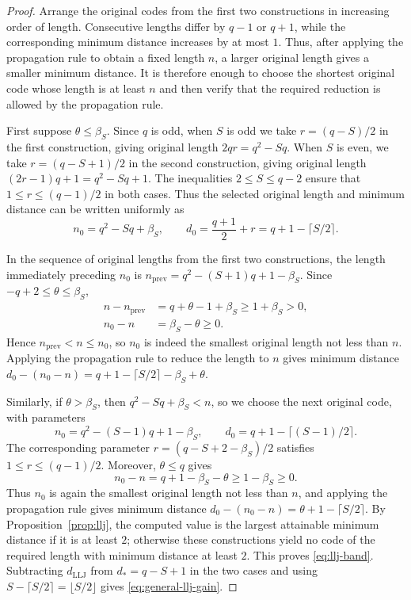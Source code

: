 \documentclass[preprint,12pt,a4paper]{elsarticle}
\begin{document}
\begin{proof}
Arrange the original codes from the first two constructions in increasing order of length. Consecutive lengths differ by $q-1$ or $q+1$, while the corresponding minimum distance increases by at most $1$. Thus, after applying the propagation rule to obtain a fixed length $n$, a larger original length gives a smaller minimum distance. It is therefore enough to choose the shortest original code whose length is at least $n$ and then verify that the required reduction is allowed by the propagation rule.

First suppose $\theta\le\beta_S$. Since $q$ is odd, when $S$ is odd we take $r=(q-S)/2$ in the first construction, giving original length $2qr=q^2-Sq$. When $S$ is even, we take $r=(q-S+1)/2$ in the second construction, giving original length $(2r-1)q+1=q^2-Sq+1$. The inequalities $2\le S\le q-2$ ensure that $1\le r\le(q-1)/2$ in both cases. Thus the selected original length and minimum distance can be written uniformly as
\[
 n_0=q^2-Sq+\beta_S,\qquad
 d_0=\frac{q+1}{2}+r=q+1-\lceil S/2\rceil.
\]

In the sequence of original lengths from the first two constructions, the length immediately preceding $n_0$ is $n_{\mathrm{prev}}=q^2-(S+1)q+1-\beta_S$. Since $-q+2\le\theta\le\beta_S$,
\[
 \begin{aligned}
 n-n_{\mathrm{prev}}&=q+\theta-1+\beta_S\ge1+\beta_S>0,\\
 n_0-n&=\beta_S-\theta\ge0.
 \end{aligned}
\]
Hence $n_{\mathrm{prev}}<n\le n_0$, so $n_0$ is indeed the smallest original length not less than $n$. Applying the propagation rule to reduce the length to $n$ gives minimum distance $d_0-(n_0-n)=q+1-\lceil S/2\rceil-\beta_S+\theta$.

Similarly, if $\theta>\beta_S$, then $q^2-Sq+\beta_S<n$, so we choose the next original code, with parameters
\[
 n_0=q^2-(S-1)q+1-\beta_S,\qquad
 d_0=q+1-\lceil(S-1)/2\rceil.
\]
The corresponding parameter $r=(q-S+2-\beta_S)/2$ satisfies $1\le r\le(q-1)/2$. Moreover, $\theta\le q$ gives
\[
 n_0-n=q+1-\beta_S-\theta\ge1-\beta_S\ge0.
\]
Thus $n_0$ is again the smallest original length not less than $n$, and applying the propagation rule gives minimum distance $d_0-(n_0-n)=\theta+1-\lceil S/2\rceil$. By Proposition~\ref{prop:llj}, the computed value is the largest attainable minimum distance if it is at least $2$; otherwise these constructions yield no code of the required length with minimum distance at least $2$. This proves \eqref{eq:llj-band}. Subtracting $d_{\mathrm{LLJ}}$ from $d_*=q-S+1$ in the two cases and using $S-\lceil S/2\rceil=\lfloor S/2\rfloor$ gives \eqref{eq:general-llj-gain}.
\end{proof}
\end{document}
